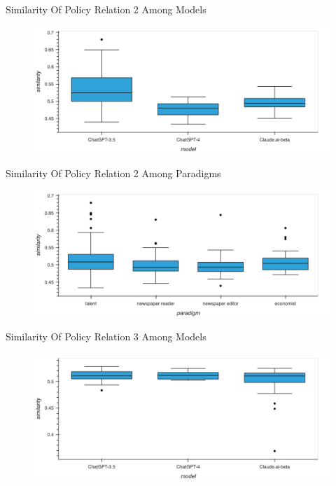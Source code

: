 \documentclass[12pt]{beamer}
\begin{document}
\begin{frame}{Similarity Of Policy Relation 2 Among Models}
\begin{figure}[H]
\centering
\includegraphics[width=11.5cm]{Figures/fig29.png}
\end{figure}
\end{frame}


\begin{frame}{Similarity Of Policy Relation 2 Among Paradigms}
\begin{figure}[H]
\centering
\includegraphics[width=11.5cm]{Figures/fig30.png}
\end{figure}
\end{frame}


\begin{frame}{Similarity Of Policy Relation 3 Among Models}
\begin{figure}[H]
\centering
\includegraphics[width=11.5cm]{Figures/fig31.png}
\end{figure}
\end{frame}
\end{document}
